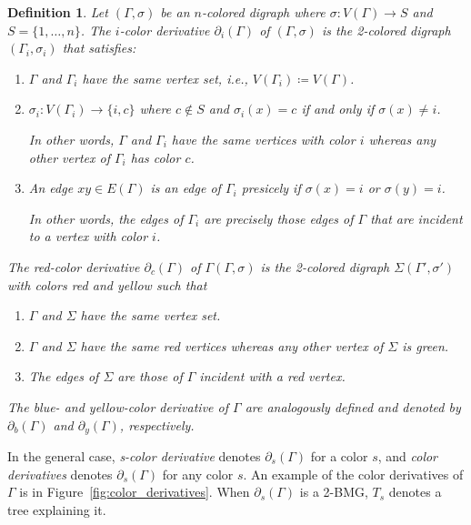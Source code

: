 \documentclass[final,3p,times]{elsarticle}
\newtheorem{definition}{Definition}[section]
\newcommand{\OLD}[1]{\begingroup\tiny\color{gray}#1\endgroup}
\newcommand{\mh}[1]{\begingroup\color{magenta}#1\endgroup}
\begin{document}
\begin{definition}
\label{def:color-derivative}
\mh{Let $(\Gamma,\sigma)$ be an $n$-colored digraph where $\sigma\colon V(\Gamma) \to S$ 
and $S = \{1,\dots,n\}$. The  \emph{$i$-color derivative} $\partial_i(\Gamma)$ of $(\Gamma,\sigma)$
is the 2-colored digraph $(\Gamma_i,\sigma_i)$  that satisfies:
\begin{enumerate}
    \item $\Gamma$ and $\Gamma_i$ have the same vertex set, i.e.,  $V(\Gamma_i) \coloneqq V(\Gamma)$.
    \item $\sigma_i\colon V(\Gamma_i) \to \{i,c\}$ where $c\notin S$
    	  and $\sigma_i(x)=c$ if and only if $\sigma(x)\neq i$. 
    	  
    	  In other words,  $\Gamma$ and $\Gamma_i$ have the same vertices with color $i$ 
    	  whereas any other vertex of $\Gamma_i$ has color $c$.  
    
    \item An edge $xy\in E(\Gamma)$ is an edge of $\Gamma_i$ presicely if 
    	  $\sigma(x)=i	$ or  $\sigma(y)=i$.
    	  
    	  In other words, the edges of $\Gamma_i$ are precisely those edges 
    	  of $\Gamma$ that are incident to a vertex with color $i$.
\end{enumerate}
}



\OLD{
The \emph{red-color derivative} $\partial_c(\Gamma)$ of \OLD{$\Gamma$}\mh{$(\Gamma,\sigma)$} 
is the 2-colored digraph \OLD{$\Sigma$}\mh{$(\Gamma',\sigma')$} 
with colors red and yellow such that
\begin{enumerate}
    \item $\Gamma$ and $\Sigma$ have the same vertex set. 
    \item $\Gamma$ and $\Sigma$ have the same red vertices whereas any other vertex of $\Sigma$ is green. 
    \item The edges of $\Sigma$ are those of $\Gamma$ incident with a red vertex. 
\end{enumerate}
The blue- and yellow-color derivative of $\Gamma$ are analogously defined and denoted by $\partial_b(\Gamma)$ and $\partial_y(\Gamma)$, respectively. }
\end{definition} 

In the general case, \emph{s-color derivative} denotes $\partial_s(\Gamma)$ for a color $s$, and \emph{color derivatives} denotes $\partial_s(\Gamma)$ for any color $s$. An example of the color derivatives of $\Gamma$ is in Figure~\ref{fig:color_derivatives}. When $\partial_s(\Gamma)$ is a 2-BMG, $T_s$ denotes a tree explaining it.
\end{document}
